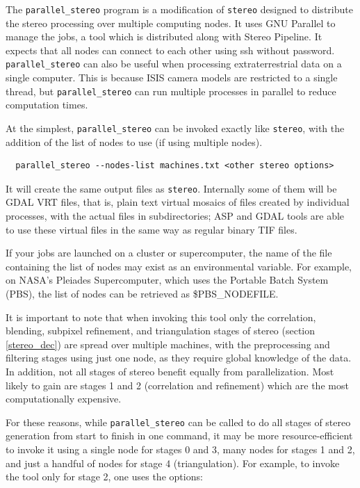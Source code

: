 The \texttt{parallel\_stereo} program is a modification of
\texttt{stereo} designed to distribute the stereo processing over
multiple computing nodes. It uses GNU Parallel to manage the jobs, a tool which
is distributed along with Stereo Pipeline. It expects that all nodes
can connect to each other using ssh without password. \texttt{parallel\_stereo}
can also be useful when processing extraterrestrial data on a single computer.
This is because ISIS camera models are restricted to a single thread, but
\texttt{parallel\_stereo} can run multiple processes in parallel to reduce
computation times.

At the simplest, \texttt{parallel\_stereo} can be invoked exactly like \texttt{stereo},
with the addition of the list of nodes to use (if using multiple nodes).

\begin{verbatim}
  parallel_stereo --nodes-list machines.txt <other stereo options>
\end{verbatim}

It will create the same output files as \texttt{stereo}. Internally
some of them will be GDAL VRT files, that is, plain text virtual mosaics 
of files created by individual processes, with the actual files in subdirectories;
ASP and GDAL tools are able to use these
virtual files in the same way as regular binary TIF files.

If your jobs are launched on a cluster or supercomputer, the name of the
file containing the list of nodes may exist as an environmental
variable. For example, on NASA's Pleiades Supercomputer, which uses the
Portable Batch System (PBS), the list of nodes can be retrieved as
\$PBS\_NODEFILE.

It is important to note that when invoking this tool only the correlation, 
blending, subpixel refinement, and triangulation stages of stereo 
(section \ref{stereo_dec}) are spread over multiple machines, with 
the preprocessing and filtering stages using just one node, as they require
global knowledge of the data. In addition, not all stages of stereo
benefit equally from parallelization. Most likely to gain are stages 1
and 2 (correlation and refinement) which are the most computationally
expensive.

For these reasons, while \texttt{parallel\_stereo} can be called to do
all stages of stereo generation from start to finish in one command, it
may be more resource-efficient to invoke it using a single node for
stages 0 and 3, many nodes for stages 1 and 2, and just a handful of
nodes for stage 4 (triangulation). For example, to invoke the tool
only for stage 2, one uses the options:

